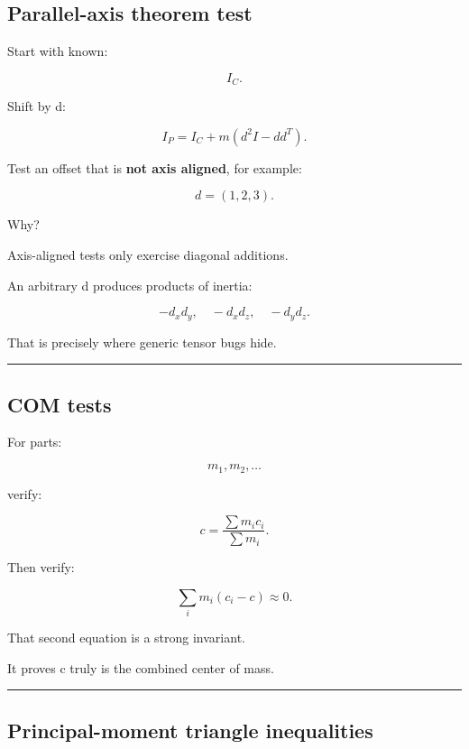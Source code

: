 \subsection{Parallel-axis theorem test}\label{06-engine-ii-ch039-parallel-axis-theorem-test}

\hypertarget{06-engine-ii-ch039-parallel-axis-theorem-test}{}

Start with known:

\[
I_C.
\]

Shift by d:

\[
I_P
=
I_C+
m(d^2I-dd^T).
\]

Test an offset that is \textbf{not axis aligned}, for example:

\[
d=(1,2,3).
\]

Why?

Axis-aligned tests only exercise diagonal additions.

An arbitrary d produces products of inertia:

\[
-d_xd_y,
\quad
-d_xd_z,
\quad
-d_yd_z.
\]

That is precisely where generic tensor bugs hide.

\begin{center}\rule{0.5\linewidth}{0.5pt}\end{center}

\subsection{COM tests}\label{06-engine-ii-ch039-com-tests}

\hypertarget{06-engine-ii-ch039-com-tests}{}

For parts:

\[
m_1,m_2,\ldots
\]

verify:

\[
c
=
\frac{\sum m_ic_i}{\sum m_i}.
\]

Then verify:

\[
\sum_i
m_i(c_i-c)
\approx0.
\]

That second equation is a strong invariant.

It proves c truly is the combined center of mass.

\begin{center}\rule{0.5\linewidth}{0.5pt}\end{center}

\subsection{Principal-moment triangle inequalities}\label{06-engine-ii-ch039-principal-moment-triangle-inequalities}

